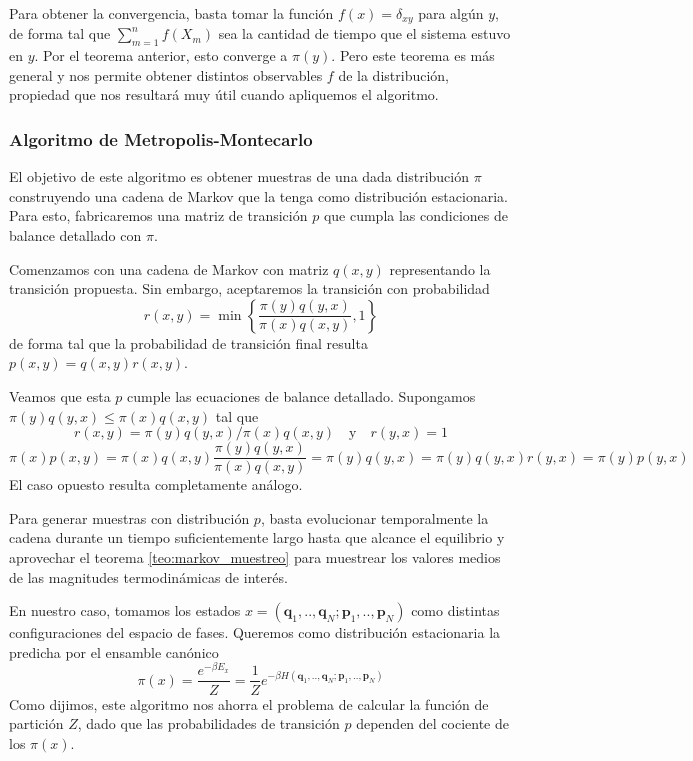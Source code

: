 Para obtener la convergencia, basta tomar la función $f(x) = \delta_{xy}$ para algún $y$, de forma tal que $\sum_{m=1}^n f(X_m)$ sea la cantidad de tiempo que el sistema estuvo en $y$.
Por el teorema anterior, esto converge a $\pi(y)$.
Pero este teorema es más general y nos permite obtener distintos observables $f$ de la distribución, propiedad que nos resultará muy útil cuando apliquemos el algoritmo.


\subsubsection{Algoritmo de Metropolis-Montecarlo}{\label{sec:alg_mm}}

El objetivo de este algoritmo es obtener muestras de una dada distribución $\pi$ construyendo una cadena de Markov que la tenga como distribución estacionaria.
Para esto, fabricaremos una matriz de transición $p$ que cumpla las condiciones de balance detallado con $\pi$.

Comenzamos con una cadena de Markov con matriz $q(x,y)$ representando la transición propuesta.
Sin embargo, aceptaremos la transición con probabilidad\cite{Metropolis1953}
\[r(x,y) = \min \left\{ \frac{\pi(y)q(y,x)}{\pi(x)q(x,y)}, 1\right\}\]
de forma tal que la probabilidad de transición final resulta $p(x,y) = q(x,y)r(x,y)$.

Veamos que esta $p$ cumple las ecuaciones de balance detallado.
Supongamos $\pi(y)q(y,x) \leq \pi(x)q(x,y)$ tal que 
\[
r(x,y) = \pi(y)q(y,x)/\pi(x)q(x,y) \quad \text{y} \quad r(y,x) = 1\]
\[ \pi(x) p(x, y) = \pi(x) q(x,y)\frac{\pi(y)q(y,x)}{\pi(x)q(x,y)} = \pi(y)q(y,x) = \pi(y)q(y,x)r(y,x) = \pi(y)p(y,x) \]
El caso opuesto resulta completamente análogo.

Para generar muestras con distribución $p$, basta evolucionar temporalmente la cadena durante un tiempo suficientemente largo hasta que alcance el equilibrio y
aprovechar el teorema \ref{teo:markov_muestreo} para muestrear los valores medios de las magnitudes termodinámicas de interés.

En nuestro caso, tomamos los estados $x = (\mathbf{q}_1,..,\mathbf{q}_N;\mathbf{p}_1,..,\mathbf{p}_N)$ como distintas configuraciones del espacio de fases.
Queremos como distribución estacionaria la predicha por el ensamble canónico \[\pi(x) = \frac{e^{-\beta E_x}}{Z} = \frac{1}{Z}e^{-\beta H(\mathbf{q}_1,..,\mathbf{q}_N;\mathbf{p}_1,..,\mathbf{p}_N)}\]
Como dijimos, este algoritmo nos ahorra el problema de calcular la función de partición $Z$, dado que las probabilidades de transición $p$ dependen del cociente de los $\pi(x)$.

